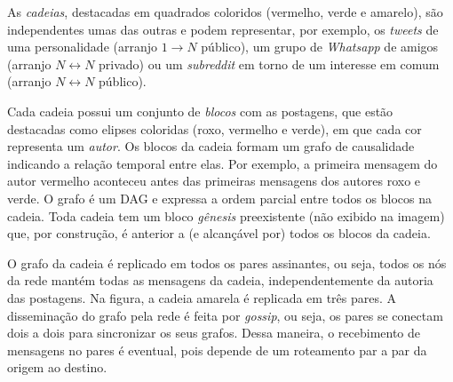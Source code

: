 \documentclass[12pt]{article}
\newcommand{\Xon} {$1{\rightarrow}N$\xspace}
\newcommand{\Xnn} {$N{\leftrightarrow}N$\xspace}
\begin{document}
As \emph{cadeias}, destacadas em quadrados coloridos (vermelho, verde e
amarelo), são independentes umas das outras e podem representar, por exemplo,
os \emph{tweets} de uma personalidade (arranjo \Xon público), um grupo de
\emph{Whatsapp} de amigos (arranjo \Xnn privado) ou um \emph{subreddit} em
torno de um interesse em comum (arranjo \Xnn público).

Cada cadeia possui um conjunto de \emph{blocos} com as postagens, que estão
destacadas como elipses coloridas (roxo, vermelho e verde), em que cada cor
representa um \emph{autor}.
Os blocos da cadeia formam um grafo de causalidade indicando a relação temporal
entre elas.
Por exemplo, a primeira mensagem do autor vermelho aconteceu antes das
primeiras mensagens dos autores roxo e verde.
O grafo é um DAG e expressa a ordem parcial entre todos os blocos na cadeia.
Toda cadeia tem um bloco \emph{gênesis} preexistente (não exibido na imagem)
que, por construção, é anterior a (e alcançável por) todos os blocos da cadeia.

O grafo da cadeia é replicado em todos os pares assinantes, ou seja, todos os
nós da rede mantém todas as mensagens da cadeia, independentemente da autoria
das postagens.
Na figura, a cadeia amarela é replicada em três pares.
A disseminação do grafo pela rede é feita por \emph{gossip}, ou seja, os pares
se conectam dois a dois para sincronizar os seus grafos.
Dessa maneira, o recebimento de mensagens no pares é eventual, pois depende de
um roteamento par a par da origem ao destino.
\end{document}
